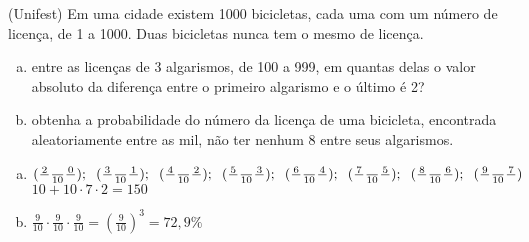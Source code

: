 \begin{ex}
 	(Unifest) Em uma cidade existem 1000 bicicletas, cada uma com um número de licença, de 1 a 1000. Duas bicicletas nunca tem o mesmo de licença. 
    \begin{enumerate}[(a)]
    \item entre as licenças de 3 algarismos, de 100 a 999, em quantas delas o valor absoluto da diferença entre o primeiro algarismo e o último é 2?
    \item obtenha a probabilidade do número da licença de uma bicicleta, encontrada aleatoriamente entre as mil, não ter nenhum 8 entre seus algarismos.
    \end{enumerate}
      \begin{sol}
        \phantom{A}
        \begin{enumerate}  [(a)]
            \item $(\frac{2}{\phantom{A}}\frac{\phantom{A}}{10}\frac{0}{\phantom{A}});\hspace{0.2cm}(\frac{3}{\phantom{A}}\frac{\phantom{A}}{10}\frac{1}{\phantom{A}});\hspace{0.2cm}(\frac{4}{\phantom{A}}\frac{\phantom{A}}{10}\frac{2}{\phantom{A}});\hspace{0.2cm}(\frac{5}{\phantom{A}}\frac{\phantom{A}}{10}\frac{3}{\phantom{A}});\hspace{0.2cm}(\frac{6}{\phantom{A}}\frac{\phantom{A}}{10}\frac{4}{\phantom{A}});\hspace{0.2cm}(\frac{7}{\phantom{A}}\frac{\phantom{A}}{10}\frac{5}{\phantom{A}});\hspace{0.2cm}(\frac{8}{\phantom{A}}\frac{\phantom{A}}{10}\frac{6}{\phantom{A}});\hspace{0.2cm}(\frac{9}{\phantom{A}}\frac{\phantom{A}}{10}\frac{7}{\phantom{A}})$ \\
            $10+10\cdot7\cdot2=150$
            \item $\frac{9}{10}\cdot\frac{9}{10}\cdot\frac{9}{10}=(\frac{9}{10})^3=72,9\%$
        \end{enumerate}
      \end{sol}
\end{ex}